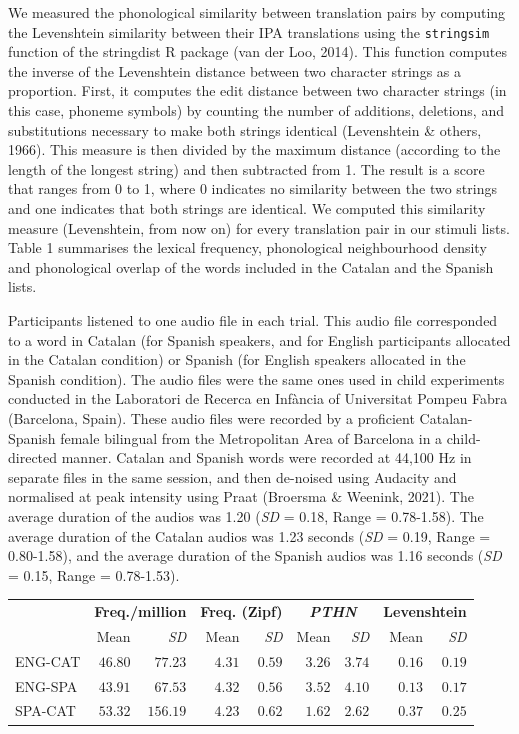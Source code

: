 \documentclass[
  english,
  man,floatsintext]{apa6}
\begin{document}
We measured the phonological similarity between translation pairs by computing the Levenshtein similarity between their IPA translations using the \texttt{stringsim} function of the stringdist R package (van der Loo, 2014). This function computes the inverse of the Levenshtein distance between two character strings as a proportion. First, it computes the edit distance between two character strings (in this case, phoneme symbols) by counting the number of additions, deletions, and substitutions necessary to make both strings identical (Levenshtein \& others, 1966). This measure is then divided by the maximum distance (according to the length of the longest string) and then subtracted from 1. The result is a score that ranges from 0 to 1, where 0 indicates no similarity between the two strings and one indicates that both strings are identical. We computed this similarity measure (Levenshtein, from now on) for every translation pair in our stimuli lists. Table 1 summarises the lexical frequency, phonological neighbourhood density and phonological overlap of the words included in the Catalan and the Spanish lists.

Participants listened to one audio file in each trial. This audio file corresponded to a word in Catalan (for Spanish speakers, and for English participants allocated in the Catalan condition) or Spanish (for English speakers allocated in the Spanish condition). The audio files were the same ones used in child experiments conducted in the Laboratori de Recerca en Infància of Universitat Pompeu Fabra (Barcelona, Spain). These audio files were recorded by a proficient Catalan-Spanish female bilingual from the Metropolitan Area of Barcelona in a child-directed manner. Catalan and Spanish words were recorded at 44,100 Hz in separate files in the same session, and then de-noised using Audacity and normalised at peak intensity using Praat (Broersma \& Weenink, 2021). The average duration of the audios was 1.20 (\emph{SD} = 0.18, Range = 0.78-1.58). The average duration of the Catalan audios was 1.23 seconds (\emph{SD} = 0.19, Range = 0.80-1.58), and the average duration of the Spanish audios was 1.16 seconds (\emph{SD} = 0.15, Range = 0.78-1.53).

\captionsetup[table]{labelformat=empty,skip=1pt}
\begin{longtable}{lrrrrrrrr}
\toprule
 & \multicolumn{2}{c}{\textbf{Freq./million}} & \multicolumn{2}{c}{\textbf{Freq. (Zipf)}} & \multicolumn{2}{c}{\emph{\textbf{PTHN}}} & \multicolumn{2}{c}{\textbf{Levenshtein}} \\ 
 \cmidrule(lr){2-3} \cmidrule(lr){4-5} \cmidrule(lr){6-7} \cmidrule(lr){8-9}
 & Mean & \emph{SD} & Mean & \emph{SD} & Mean & \emph{SD} & Mean & \emph{SD} \\ 
\midrule
ENG-CAT & $46.80$ & $77.23$ & $4.31$ & $0.59$ & $3.26$ & $3.74$ & $0.16$ & $0.19$ \\ 
ENG-SPA & $43.91$ & $67.53$ & $4.32$ & $0.56$ & $3.52$ & $4.10$ & $0.13$ & $0.17$ \\ 
SPA-CAT & $53.32$ & $156.19$ & $4.23$ & $0.62$ & $1.62$ & $2.62$ & $0.37$ & $0.25$ \\ 
 \bottomrule
\end{longtable}
\end{document}
